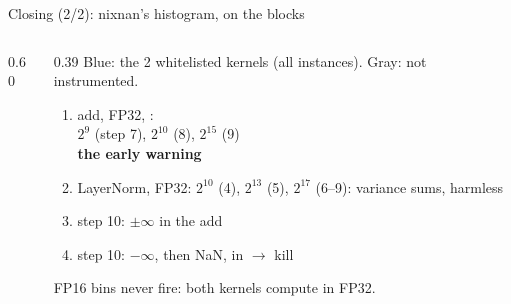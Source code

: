 \documentclass[aspectratio=169,11pt]{beamer}
\newcommand{\code}[1]{\texttt{\detokenize{#1}}}
\begin{document}
\begin{frame}{Closing (2/2): nixnan's histogram, on the blocks}
\begin{columns}[c]
\begin{column}{0.60\textwidth}\centering{}
\end{column}
\begin{column}{0.39\textwidth}\scriptsize
Blue: the 2 whitelisted kernels (all instances). Gray: not instrumented.
\begin{enumerate}\setlength{\itemsep}{1pt}
\item add, FP32, \code{FFMA ...c[0x0][0x164]...}:\\ $2^{9}$ (step 7), $2^{10}$ (8), $2^{15}$ (9)\\ \textbf{the early warning}
\item LayerNorm, FP32: $2^{10}$ (4), $2^{13}$ (5), $2^{17}$ (6--9): variance sums, harmless
\item step 10: $\pm\infty$ in the add
\item step 10: $-\infty$, then NaN, in \code{ln2} $\to$ kill
\end{enumerate}
FP16 bins never fire: both kernels compute in FP32.
\end{column}
\end{columns}
\end{frame}
\end{document}
